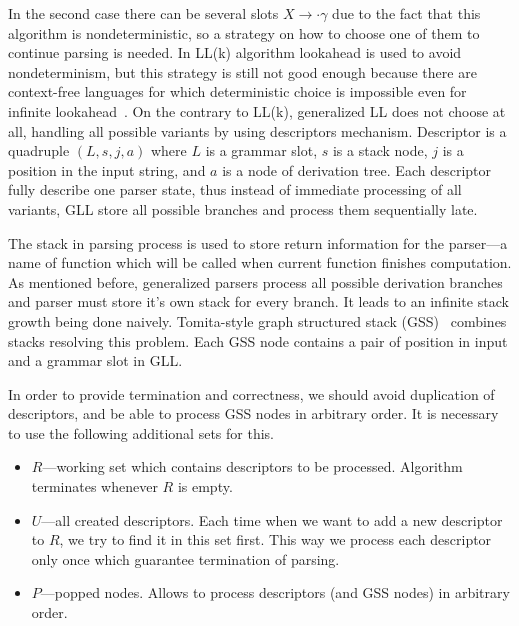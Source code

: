 In the second case there can be several slots $X \rightarrow \cdot \gamma$ due to the fact that this algorithm is nondeterministic, so a strategy on how to choose one of them to continue parsing is needed.
In LL(k) algorithm lookahead is used to avoid nondeterminism, but this strategy is still not good enough because there are context-free languages for which deterministic choice is impossible even for infinite lookahead~\cite{LLnonLL}.
On the contrary to LL(k), generalized LL does not choose at all, handling all possible variants by using descriptors mechanism.
Descriptor is a quadruple $(L, s, j, a)$ where $L$ is a grammar slot, $s$ is a stack node, $j$ is a position in the input string, and $a$ is a node of derivation tree.
Each descriptor fully describe one parser state, thus instead of immediate processing of all variants, GLL store all possible branches and process them sequentially late.

The stack in parsing process is used to store return information for the parser---a name of function which will be called when current function finishes computation. 
As mentioned before, generalized parsers process all possible derivation branches and parser must store it's own stack for every branch. 
It leads to an infinite stack growth being done naively.  
Tomita-style graph structured stack (GSS)~\cite{Tomita} combines stacks resolving this problem.
Each GSS node contains a pair of position in input and a grammar slot in GLL. 

In order to provide termination and correctness, we should avoid duplication of descriptors, and be able to process GSS nodes in arbitrary order. It is necessary to use the following additional sets for this.
\begin{itemize}
\item $R$---working set which contains descriptors to be processed. Algorithm terminates whenever $R$ is empty.
\item $U$---all created descriptors. Each time when we want to add a new descriptor to $R$, we try to find it in this set first.
This way we process each descriptor only once which guarantee termination of parsing.
\item $P$---popped nodes. Allows to process descriptors (and GSS nodes) in arbitrary order. 
\end{itemize}


